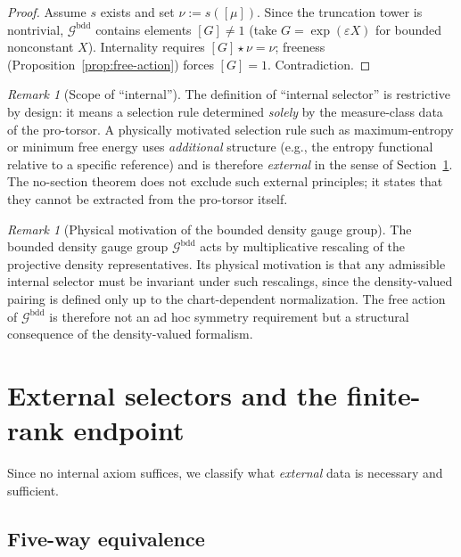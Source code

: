 \documentclass[12pt,a4paper]{article}
\theoremstyle{plain}
\theoremstyle{definition}
\theoremstyle{remark}
\newtheorem{remark}[theorem]{Remark}
\newcommand{\cG}{\mathcal{G}}
\begin{document}
\begin{proof}
Assume $s$ exists and set $\nu := s([\mu])$.  Since the truncation
tower is nontrivial, $\cG^{\mathrm{bdd}}$ contains elements
$[G] \ne 1$ (take $G = \exp(\varepsilon X)$ for bounded nonconstant
$X$).  Internality requires $[G]\star\nu = \nu$; freeness
(Proposition~\ref{prop:free-action}) forces $[G] = 1$.
Contradiction.
\end{proof}

\begin{remark}[Scope of ``internal'']
\label{rem:internal-scope}
The definition of ``internal selector'' is restrictive by design:
it means a selection rule determined \emph{solely} by the measure-class
data of the pro-torsor.  A physically motivated selection rule such as
maximum-entropy or minimum free energy uses \emph{additional} structure
(e.g., the entropy functional relative to a specific reference) and is
therefore \emph{external} in the sense of
Section~\ref{sec:external}.  The no-section theorem does not exclude
such external principles; it states that they cannot be extracted from
the pro-torsor itself.
\end{remark}

\begin{remark}[Physical motivation of the bounded density gauge group]
\label{rem:gauge-motivation}
The bounded density gauge group $\cG^{\mathrm{bdd}}$ acts by
multiplicative rescaling of the projective density representatives.
Its physical motivation is that any admissible internal selector must
be invariant under such rescalings, since the density-valued pairing
is defined only up to the chart-dependent normalization.  The free
action of $\cG^{\mathrm{bdd}}$ is therefore not an ad hoc symmetry
requirement but a structural consequence of the density-valued
formalism.
\end{remark}


\section{External selectors and the finite-rank endpoint}
\label{sec:external}

Since no internal axiom suffices, we classify what \emph{external}
data is necessary and sufficient.

\subsection{Five-way equivalence}
\end{document}
